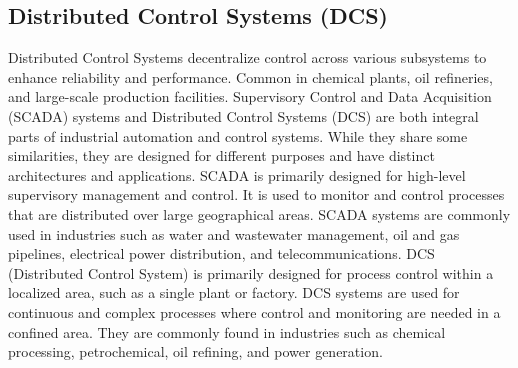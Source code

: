 \subsection{Distributed Control Systems (DCS) }
Distributed Control Systems decentralize control across various subsystems to enhance reliability and performance. Common in chemical plants, oil refineries, and large-scale production facilities.
Supervisory Control and Data Acquisition (SCADA) systems and Distributed Control Systems (DCS) are both integral parts of industrial automation and control systems. While they share some similarities, they are designed for different purposes and have distinct architectures and applications. SCADA is primarily designed for high-level supervisory management and control. It is used to monitor and control processes that are distributed over large geographical areas. SCADA systems are commonly used in industries such as water and wastewater management, oil and gas pipelines, electrical power distribution, and telecommunications. DCS (Distributed Control System) is primarily designed for process control within a localized area, such as a single plant or factory. DCS systems are used for continuous and complex processes where control and monitoring are needed in a confined area. They are commonly found in industries such as chemical processing, petrochemical, oil refining, and power generation.

